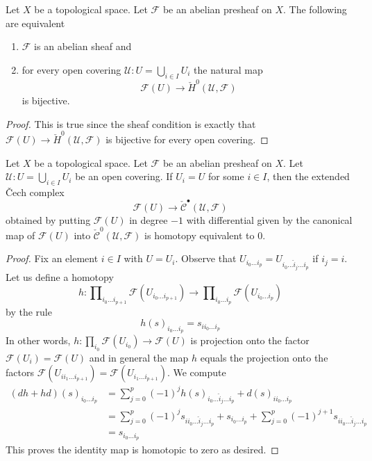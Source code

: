 \begin{lemma}
\label{lemma-cech-h0}
Let $X$ be a topological space.
Let $\mathcal{F}$ be an abelian presheaf on $X$.
The following are equivalent
\begin{enumerate}
\item $\mathcal{F}$ is an abelian sheaf and
\item for every open covering $\mathcal{U} : U = \bigcup_{i \in I} U_i$
the natural map
$$
\mathcal{F}(U) \to \check{H}^0(\mathcal{U}, \mathcal{F})
$$
is bijective.
\end{enumerate}
\end{lemma}

\begin{proof}
This is true since the sheaf condition is exactly that
$\mathcal{F}(U) \to \check{H}^0(\mathcal{U}, \mathcal{F})$
is bijective for every open covering.
\end{proof}

\begin{lemma}
\label{lemma-cech-trivial}
Let $X$ be a topological space. Let $\mathcal{F}$ be an abelian presheaf on $X$.
Let $\mathcal{U} : U = \bigcup_{i \in I} U_i$ be an open covering. If
$U_i = U$ for some $i \in I$, then the extended {\v C}ech complex
$$
\mathcal{F}(U) \to \check{\mathcal{C}}^\bullet(\mathcal{U}, \mathcal{F})
$$
obtained by putting $\mathcal{F}(U)$ in degree $-1$ with differential given by
the canonical map of $\mathcal{F}(U)$ into
$\check{\mathcal{C}}^0(\mathcal{U}, \mathcal{F})$
is homotopy equivalent to $0$.
\end{lemma}

\begin{proof}
Fix an element $i \in I$ with $U = U_i$. Observe that
$U_{i_0 \ldots i_p} = U_{i_0 \ldots \hat i_j \ldots i_p}$ if $i_j = i$.
Let us define a homotopy
$$
h :
\prod\nolimits_{i_0 \ldots i_{p + 1}} \mathcal{F}(U_{i_0 \ldots i_{p + 1}})
\longrightarrow
\prod\nolimits_{i_0 \ldots i_p} \mathcal{F}(U_{i_0 \ldots i_p})
$$
by the rule
$$
h(s)_{i_0 \ldots i_p} = s_{i i_0 \ldots i_p}
$$
In other words, $h : \prod_{i_0} \mathcal{F}(U_{i_0}) \to \mathcal{F}(U)$
is projection onto the factor $\mathcal{F}(U_i) = \mathcal{F}(U)$
and in general the map $h$ equals the projection onto the factors
$\mathcal{F}(U_{i i_1 \ldots i_{p + 1}}) =
\mathcal{F}(U_{i_1 \ldots i_{p + 1}})$.
We compute
\begin{align*}
(dh + hd)(s)_{i_0 \ldots i_p}
& =
\sum\nolimits_{j = 0}^p
(-1)^j
h(s)_{i_0 \ldots \hat i_j \ldots i_p}
+
d(s)_{i i_0 \ldots i_p}\\
& =
\sum\nolimits_{j = 0}^p
(-1)^j
s_{i i_0 \ldots \hat i_j \ldots i_p}
+
s_{i_0 \ldots i_p}
+
\sum\nolimits_{j = 0}^p
(-1)^{j + 1}
s_{i i_0 \ldots \hat i_j \ldots i_p} \\
& =
s_{i_0 \ldots i_p}
\end{align*}
This proves the identity map is homotopic to zero as desired.
\end{proof}






